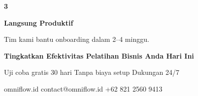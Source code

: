 \documentclass[a4paper]{article}
\begin{document}
\begin{center}
\begin{minipage}[t]{0.318\textwidth}
{\begin{minipage}{\dimexpr\linewidth-2\fboxsep\relax}
            \begin{center}
                {\fontsize{22}{26}\selectfont\bfseries\color{BluePrimary} 3}
            \end{center}
            \vspace{2pt}
            \begin{center}
                {\fontsize{10}{13}\selectfont\bfseries\color{BlueDark} Langsung Produktif}\par\vspace{3pt}
                {\fontsize{9}{12}\selectfont\color{TextDark} Tim kami bantu onboarding dalam 2--4 minggu.}
            \end{center}
            \vspace{6pt}
        \end{minipage}}
\end{minipage}
\end{center}

\vspace{8pt}

{\setlength{\fboxsep}{10pt}\setlength{\fboxrule}{0pt}%
\noindent\colorbox{BluePrimary}{%
    \begin{minipage}{\dimexpr\textwidth-2\fboxsep\relax}
        \centering
        {\fontsize{13}{16}\selectfont\bfseries\color{White}
        Tingkatkan Efektivitas Pelatihan Bisnis Anda Hari Ini}\par\vspace{3pt}
        {\fontsize{9.5}{12}\selectfont\color{BlueMid}
        Uji coba gratis 30 hari \enspace\textbullet\enspace Tanpa biaya setup \enspace\textbullet\enspace Dukungan 24/7}\par\vspace{2pt}
        {\fontsize{9.5}{12}\selectfont\color{BlueLight}
        omniflow.id \enspace\textbullet\enspace contact@omniflow.id \enspace\textbullet\enspace +62 821 2560 9413}
    \end{minipage}}}

\restoregeometry
\pagestyle{empty}
\end{document}
